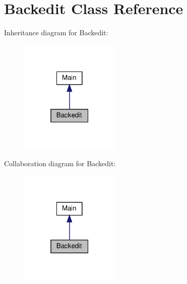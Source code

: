 \hypertarget{class_src_1_1_controllers_1_1_backedit}{}\section{Backedit Class Reference}
\label{class_src_1_1_controllers_1_1_backedit}


Inheritance diagram for Backedit\+:
\nopagebreak
\begin{figure}[H]
\begin{center}
\leavevmode
\includegraphics[width=135pt]{class_src_1_1_controllers_1_1_backedit__inherit__graph}
\end{center}
\end{figure}


Collaboration diagram for Backedit\+:
\nopagebreak
\begin{figure}[H]
\begin{center}
\leavevmode
\includegraphics[width=135pt]{class_src_1_1_controllers_1_1_backedit__coll__graph}
\end{center}
\end{figure}

